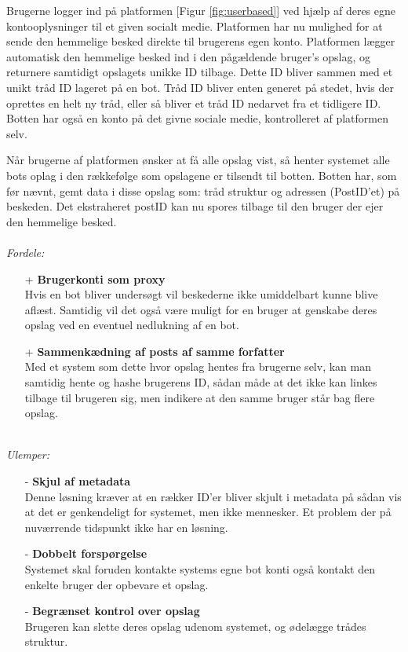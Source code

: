 Brugerne logger ind på platformen [Figur \ref{fig:userbased}] ved hjælp af deres egne kontooplysninger til et given socialt medie. Platformen har nu mulighed for at sende den hemmelige besked direkte til brugerens egen konto. Platformen lægger automatisk den hemmelige besked ind i den pågældende bruger's opslag, og returnere samtidigt opslagets unikke ID tilbage. Dette ID bliver sammen med et unikt tråd ID lageret på en bot. Tråd ID bliver enten generet på stedet, hvis der oprettes en helt ny tråd, eller så bliver et tråd ID nedarvet fra et tidligere ID. Botten har også en konto på det givne sociale medie, kontrolleret af platformen selv. 

Når brugerne af platformen ønsker at få alle opslag vist, så henter systemet alle bots oplag i den rækkefølge som opslagene er tilsendt til botten. Botten har, som før nævnt, gemt data i disse opslag som: tråd struktur og adressen (PostID'et) på beskeden. Det ekstraheret postID kan nu spores tilbage til den bruger der ejer den hemmelige besked.
\\\\
\textit{Fordele:}
\begin{itemize}
    \item[+] \textbf{Brugerkonti som proxy} \hfill \\ 
    Hvis en bot bliver undersøgt vil beskederne ikke umiddelbart kunne blive aflæst. Samtidig vil det også være muligt for en bruger at genskabe deres opslag ved en eventuel nedlukning af en bot.
    \item[+] \textbf{Sammenkædning af posts af samme forfatter} \hfill \\ 
    Med et system som dette hvor opslag hentes fra brugerne selv, kan man samtidig hente og hashe brugerens ID, sådan måde at det ikke kan linkes tilbage til brugeren sig, men indikere at den samme bruger står bag flere opslag.
\end{itemize}
\\
\textit{Ulemper:}
\begin{itemize}
    \item[-] \textbf{Skjul af metadata} \hfill \\
    Denne løsning kræver at en rækker ID'er bliver skjult i metadata på sådan vis at det er genkendeligt for systemet, men ikke mennesker. Et problem der på nuværrende tidspunkt ikke har en løsning.
    \item[-] \textbf{Dobbelt forspørgelse} \hfill \\
    Systemet skal foruden kontakte systems egne bot konti også kontakt den enkelte bruger der opbevare et opslag.
    \item[-] \textbf{Begrænset kontrol over opslag} \hfill \\ 
    Brugeren kan slette deres opslag udenom systemet, og ødelægge trådes struktur.
\end{itemize}


